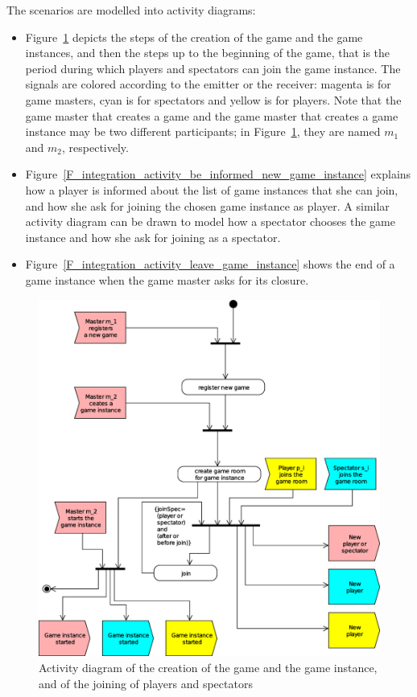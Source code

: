 The scenarios are modelled into activity diagrams:
\begin{itemize}
\item Figure~\ref{F_integration_activity_create_join} depicts the
  steps of the creation of the game and the game instances, and then
  the steps up to the beginning of the game, that is the period
  during which players and spectators can join the game instance. The
  signals are colored according to the emitter or the receiver:
  magenta is for game masters, cyan is for spectators and yellow is
  for players. Note that the game master that creates a game and the
  game master that creates a game instance may be two different
  participants; in Figure~\ref{F_integration_activity_create_join}, they
  are named $m_1$ and $m_2$, respectively.
\item Figure~\ref{F_integration_activity_be_informed_new_game_instance}
  explains how a player is informed about the list of game instances
  that she can join, and how she ask for joining the chosen game
  instance as player. A similar activity diagram can be drawn to model
  how a spectator chooses the game instance and how she ask for
  joining as a spectator.
\item Figure~\ref{F_integration_activity_leave_game_instance} shows the
  end of a game instance when the game master asks for its closure.
\end{itemize}

\begin{figure}[htbp!]
\begin{center}
\includegraphics[scale=0.5]{Figures/_integration_activity_create_join_game_instance}
\caption{Activity diagram of the creation of the game and the game
  instance, and of the joining of players and spectators}
\label{F_integration_activity_create_join}
\end{center}
\end{figure}


